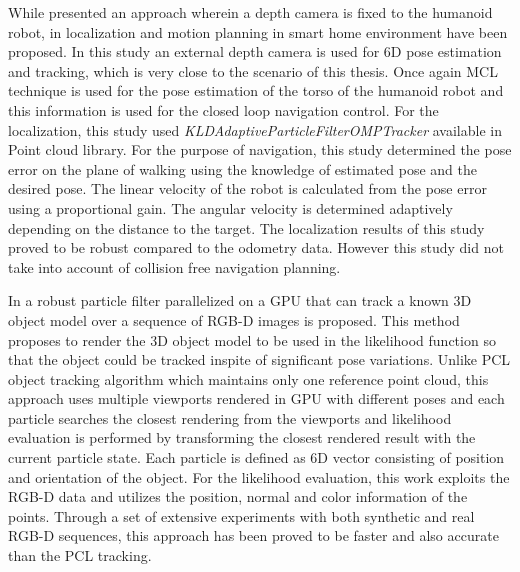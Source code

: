 {	While \cite{maier2012real} presented an approach wherein a depth camera is fixed to the humanoid robot, in \cite{cervera2012localization} localization and motion planning in smart home environment have been proposed. In this study an external depth camera is used for 6D pose estimation and tracking, which is very close to the scenario of this thesis. Once again MCL technique is used for the pose estimation of the torso of the humanoid robot and this information is used for the closed loop navigation control. For the localization, this study used  \emph{KLDAdaptiveParticleFilterOMPTracker} available in Point cloud library. For the purpose of navigation, this study determined the pose error on the plane of walking using the knowledge of estimated pose and the desired pose. The linear velocity of the robot is calculated from the pose error using a proportional gain. The angular velocity is determined adaptively depending on the distance to the target. The localization results of this study proved to be robust compared to the odometry data. However this study did not take into account of collision free navigation planning. 
	
	In \cite{choi2013rgb} a robust particle filter parallelized on a GPU that can track a known 3D object model over a sequence of RGB-D images is proposed. This method proposes to render the 3D object model to be used in the likelihood function so that the object could be tracked inspite of significant pose variations. Unlike PCL object tracking algorithm\cite{rusu20113d} which maintains only one reference point cloud, this approach uses multiple viewports rendered in GPU with different poses and each particle searches the closest rendering from the viewports and likelihood evaluation is performed by transforming the closest rendered result with the current particle state. Each particle is defined as 6D vector consisting of position and orientation of the object. For the likelihood evaluation, this work exploits the RGB-D data and utilizes the position, normal and color information of the points. Through a set of extensive experiments with both synthetic and real RGB-D sequences, this approach has been proved to be faster and also accurate than the PCL tracking.
	
}
